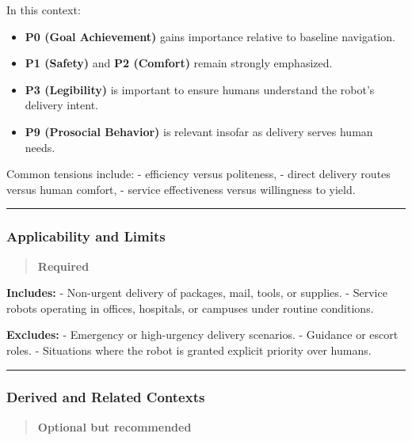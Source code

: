 \documentclass[utf8]{frontiers_suppmat} %
\providecommand{\tightlist}{%
  \setlength{\itemsep}{0pt}\setlength{\parskip}{0pt}}
\begin{document}
In this context:

\begin{itemize}
\tightlist
\item
  \textbf{P0 (Goal Achievement)} gains importance relative to baseline
  navigation.
\item
  \textbf{P1 (Safety)} and \textbf{P2 (Comfort)} remain strongly
  emphasized.
\item
  \textbf{P3 (Legibility)} is important to ensure humans understand the
  robot's delivery intent.
\item
  \textbf{P9 (Prosocial Behavior)} is relevant insofar as delivery
  serves human needs.
\end{itemize}

Common tensions include: - efficiency versus politeness, - direct
delivery routes versus human comfort, - service effectiveness versus
willingness to yield.

\begin{center}\rule{0.5\linewidth}{0.5pt}\end{center}

\subsubsection{Applicability and Limits}\label{applicability-and-limits}

\begin{quote}
\textbf{Required}
\end{quote}

\textbf{Includes:} - Non-urgent delivery of packages, mail, tools, or
supplies. - Service robots operating in offices, hospitals, or campuses
under routine conditions.

\textbf{Excludes:} - Emergency or high-urgency delivery scenarios. -
Guidance or escort roles. - Situations where the robot is granted
explicit priority over humans.

\begin{center}\rule{0.5\linewidth}{0.5pt}\end{center}

\subsubsection{Derived and Related
Contexts}\label{derived-and-related-contexts}

\begin{quote}
\textbf{Optional but recommended}
\end{quote}
\end{document}
